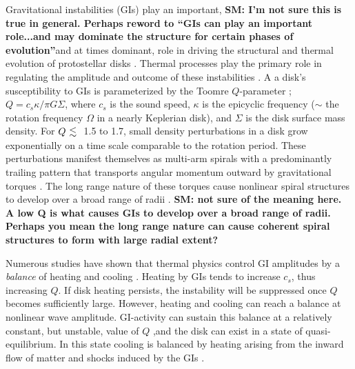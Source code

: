 \documentclass[manuscript]{aastex} %
\newcommand{\al}{\mbox{ \raisebox{-.8ex}{$\stackrel{\textstyle <}{\sim}$} }}
\begin{document}
Gravitational instabilities (GIs) play an important, {\bf SM: I'm not sure this is true in general. Perhaps reword to ``GIs can play an important role...and may dominate the structure for certain phases of evolution''}and at times dominant, role in driving the structural and thermal
evolution of  protostellar disks \citep[for a review, see][]{durisen2005}.
Thermal processes play the primary role in regulating the amplitude and outcome of these instabilities \citep{pickett1998,pickett2000,mejia2005,nelson1998,nelson2000a}. A a disk's susceptibility to GIs is parameterized by the Toomre $Q$-parameter \citep{toomre1981};  $Q = c_s \kappa / \pi G \Sigma$, where $c_s$ is the sound speed, $\kappa$ is the epicyclic frequency ($\sim$ the rotation frequency 
$\Omega$ in a nearly Keplerian disk), and $\Sigma$ is the disk surface mass density. For $Q \al$  1.5 to 1.7,  small density perturbations in a disk grow exponentially on a time scale comparable to the rotation period. These perturbations manifest themselves as multi-arm spirals with a predominantly trailing pattern that transports angular momentum outward by gravitational torques \citep[e.g.]{larson1984,boss1984,durisen1986,papaloizou1991, laughlin1994,nelson1998,pickett1998}. The long range nature of these torques cause nonlinear
spiral structures to develop over a broad range of radii \citep{laughlin1998,nelson1998,nelson2000a,pickett1998, pickett2000,pickett2003}. {\bf SM: not sure of the meaning here. A low Q is what causes GIs to develop over a broad range of radii. Perhaps you mean the long range nature can cause coherent spiral structures to form with large radial extent?}

Numerous studies have shown that thermal physics control GI amplitudes by a {\it balance} of heating and cooling \citep[for example][]{tomley1991,tomley1994,pickett1998,pickett2000, pickett2003,gammie2001,boss2002,rice2003b,mejia2005,boley2006,boley2007, stamatellos2008,cossins2009}.
Heating by GIs tends to increase $c_s$, thus increasing $Q$. If disk heating persists, the instability will be suppressed once $Q$ becomes sufficiently large.  However, heating and cooling can reach a balance at nonlinear wave amplitude. GI-activity can sustain this balance  at a relatively constant,
but unstable, value of $Q$ \citep{paczynski1978, lin1981,goldreich1965},and 
the disk can exist in a state of quasi-equilibrium. In this state cooling is 
balanced by heating arising from the inward flow of matter and shocks induced by the GIs
\citep{gammie2001, lodato2004, rice2005, cossins2009, vorobyov2010}.
\end{document}
